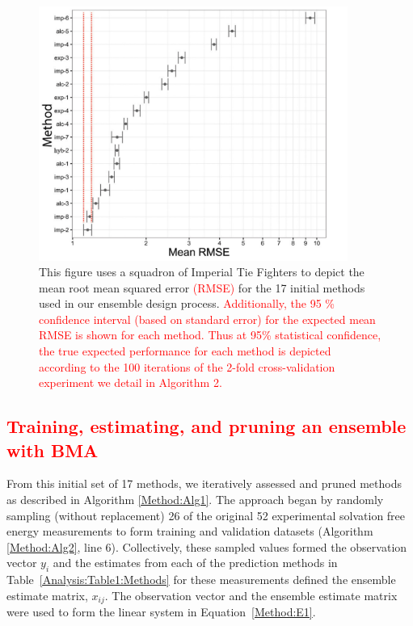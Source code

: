 \documentclass[journal=jpcbfk, manuscript=article]{achemso}
\newcommand{\+}[1]{\ensuremath{\mathbf{#1}}}
\newcommand{\rev}[1]{\textsf{\textcolor{red}{#1}}}
\begin{document}
\begin{figure}[h!]
	\centering
	\includegraphics[keepaspectratio,width=0.9\textwidth]{Figures/Rev2/RMSE_SE}
	\caption{
	This figure uses a squadron of Imperial Tie Fighters \cite{Lucas:77} to depict the mean root mean squared error \rev{(RMSE)} for the 17 initial methods used in our ensemble design process.
	\rev{Additionally, the 95 \% confidence interval (based on standard error) for the expected mean RMSE is shown for each method.
	Thus at 95\% statistical confidence, the true expected performance for each method is depicted according to the 100 iterations of the 2-fold cross-validation experiment we detail in Algorithm 2.}}
	\label{Analysis:Figure1:Methods}
\end{figure}
 
 \subsection{\rev{Training, estimating, and pruning an ensemble with BMA}} \label{EP:training}
From this initial set of 17 methods, we iteratively assessed and pruned methods as described in Algorithm \ref{Method:Alg1}.
The approach began by randomly sampling (without replacement) 26 of the original 52 experimental solvation free energy measurements to form training and validation datasets (Algorithm \ref{Method:Alg2}, line 6).
Collectively, these sampled values formed the observation vector $y_i$ and the estimates from each of the prediction methods in Table~\ref{Analysis:Table1:Methods} for these measurements defined the ensemble estimate matrix, $x_{i j}$.
The observation vector and the ensemble estimate matrix were used to form the linear system in Equation~\ref{Method:E1}.  
\end{document}
